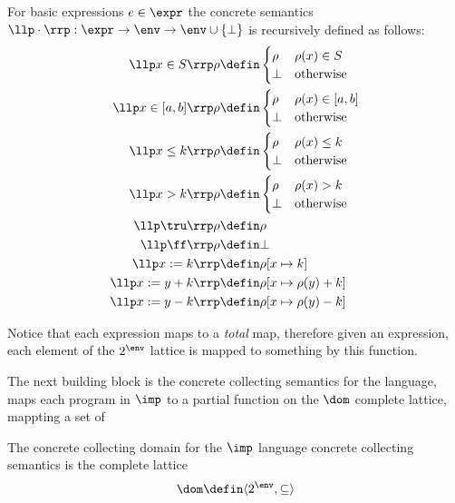 \begin{definition}
  For basic expressions \(e \in \expr\) the concrete semantics \(\llp
  \cdot \rrp : \expr \to \env \to \env \cup \{\bot\}\) is recursively
  defined as follows:
  \begin{align*}
    \llp x\in S \rrp \rho & \defin \begin{cases} \rho & \rho(x)\in S \\ \bot & \text{otherwise} \end{cases} \\
    \llp x\in [a,b] \rrp \rho & \defin \begin{cases} \rho & \rho(x)\in [a,b] \\ \bot & \text{otherwise} \end{cases} \\
    \llp x \leq k \rrp \rho & \defin \begin{cases} \rho & \rho(x)\leq k \\ \bot & \text{otherwise} \end{cases} \\
    \llp x > k \rrp \rho & \defin \begin{cases} \rho & \rho(x) > k \\ \bot & \text{otherwise} \end{cases} \\
    \llp \tru \rrp \rho & \defin \rho \\
    \llp \ff \rrp \rho & \defin \bot \\
    \llp x := k \rrp & \defin \rho [x \mapsto k] \\
    \llp x := y + k \rrp & \defin \rho [x \mapsto \rho(y) + k] \\
    \llp x := y - k \rrp & \defin \rho [x \mapsto \rho(y) - k] \\
  \end{align*}
\end{definition}

Notice that each expression maps to a \emph{total} map, therefore
given an expression, each element of the \(2^\env\) lattice is
mapped to something by this function.

The next building block is the concrete collecting semantics for the
language, maps each program in \(\imp\) to a partial function on the
\(\dom\) complete lattice, mappting a set of 

\begin{definition}
  The concrete collecting domain for the \(\imp\) language concrete
  collecting semantics is the complete lattice \[\dom \defin \langle
  2^\env , \subseteq \rangle \]
\end{definition}

